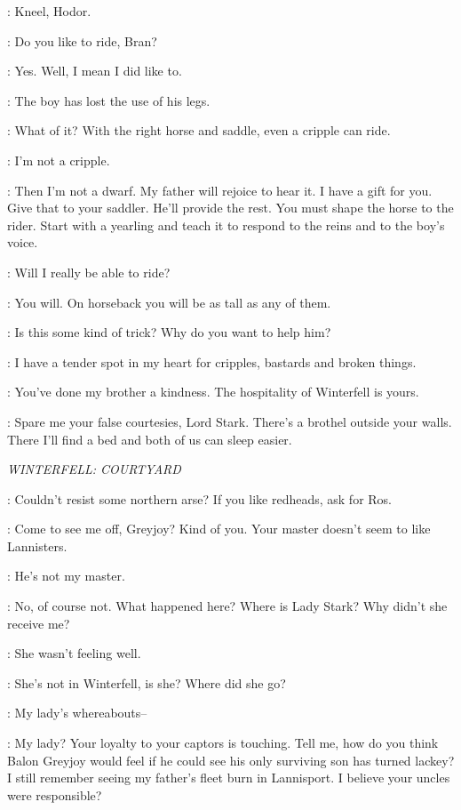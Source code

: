 \BRAN: Kneel, Hodor. 

\TYRION: Do you like to ride, Bran? 

\BRAN: Yes. Well, I mean I did like to. 

\LUWIN: The boy has lost the use of his legs. 

\TYRION: What of it? With the right horse and saddle, even a cripple can ride. 

\BRAN: I'm not a cripple. 

\TYRION: Then I'm not a dwarf. My father will rejoice to hear it. I have a gift for you.  Give that to your saddler. He'll provide the rest. You must shape the horse to the rider. Start with a yearling and teach it to respond to the reins and to the boy's voice. 

\BRAN: Will I really be able to ride? 

\TYRION: You will. On horseback you will be as tall as any of them. 

\ROBB: Is this some kind of trick? Why do you want to help him? 

\TYRION: I have a tender spot in my heart for cripples, bastards and broken things. 

\ROBB: You've done my brother a kindness. The hospitality of Winterfell is yours. 

\TYRION: Spare me your false courtesies, Lord Stark. There's a brothel outside your walls. There I'll find a bed and both of us can sleep easier. 

\scene

\textit{WINTERFELL: COURTYARD}


\THEON: Couldn't resist some northern arse? If you like redheads, ask for Ros. 

\TYRION: Come to see me off, Greyjoy? Kind of you. Your master doesn't seem to like Lannisters. 

\THEON: He's not my master. 

\TYRION: No, of course not. What happened here? Where is Lady Stark? Why didn't she receive me? 

\THEON: She wasn't feeling well. 

\TYRION: She's not in Winterfell, is she? Where did she go? 

\THEON: My lady's whereabouts-- 

\TYRION: My lady? Your loyalty to your captors is touching. Tell me, how do you think Balon Greyjoy would feel if he could see his only surviving son has turned lackey? I still remember seeing my father's fleet burn in Lannisport. I believe your uncles were responsible? 

